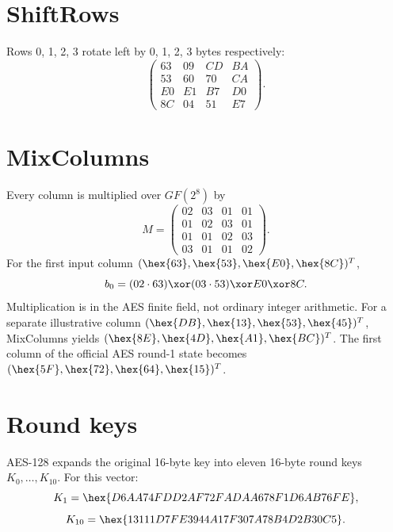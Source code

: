 \section{ShiftRows}
Rows 0, 1, 2, 3 rotate left by 0, 1, 2, 3 bytes respectively:
\[\begin{pmatrix}63&09&CD&BA\\53&60&70&CA\\E0&E1&B7&D0\\8C&04&51&E7\end{pmatrix}.\]
\section{MixColumns}
Every column is multiplied over \(GF(2^8)\) by
\[M=\begin{pmatrix}02&03&01&01\\01&02&03&01\\01&01&02&03\\03&01&01&02\end{pmatrix}.\]
For the first input column \((\hex{63},\hex{53},\hex{E0},\hex{8C})^T\),
\[b_0=(02\cdot63)\xor(03\cdot53)\xor E0\xor8C.\]
Multiplication is in the AES finite field, not ordinary integer arithmetic. For a separate illustrative column \((\hex{DB},\hex{13},\hex{53},\hex{45})^T\), MixColumns yields \((\hex{8E},\hex{4D},\hex{A1},\hex{BC})^T\). The first column of the official AES round-1 state becomes \((\hex{5F},\hex{72},\hex{64},\hex{15})^T\).
\section{Round keys}
AES-128 expands the original 16-byte key into eleven 16-byte round keys \(K_0,\ldots,K_{10}\). For this vector:
\[K_1=\hex{D6AA74FD\allowbreak{}D2AF72FA\allowbreak{}DAA678F1\allowbreak{}D6AB76FE},\]
\[K_{10}=\hex{13111D7F\allowbreak{}E3944A17\allowbreak{}F307A78B\allowbreak{}4D2B30C5}.\]
